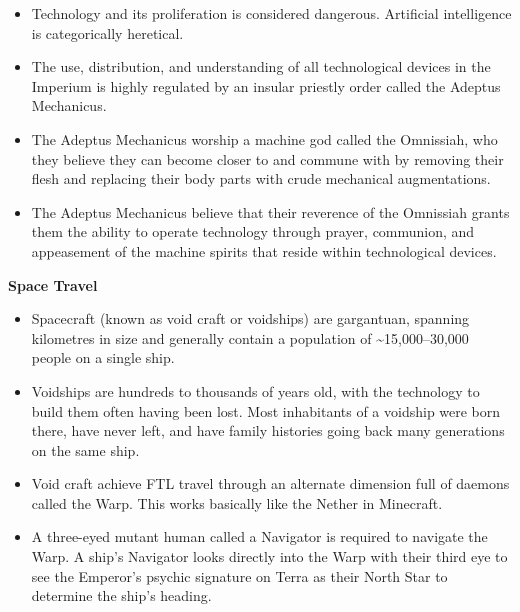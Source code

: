 \documentclass[10pt,a4paper]{article}
\newcommand{\rpgsection}[1]{%
  \vspace{0.8em}%
  {\headerfont\bfseries\Large #1}\par%
  \vspace{0.5em}%
}
\begin{document}
\begin{multicols}{2}
\begin{itemize}
  \item Technology and its proliferation is considered dangerous. Artificial intelligence is categorically heretical.
  \item The use, distribution, and understanding of all technological devices in the Imperium is highly regulated by an insular priestly order called the Adeptus Mechanicus.
  \item The Adeptus Mechanicus worship a machine god called the Omnissiah, who they believe they can become closer to and commune with by removing their flesh and replacing their body parts with crude mechanical augmentations.
  \item The Adeptus Mechanicus believe that their reverence of the Omnissiah grants them the ability to operate technology through prayer, communion, and appeasement of the machine spirits that reside within technological devices.
\end{itemize}

\rpgsection{Space Travel}
\begin{itemize}
  \item Spacecraft (known as void craft or voidships) are gargantuan, spanning kilometres in size and generally contain a population of \textasciitilde15,000–30,000 people on a single ship.
  \item Voidships are hundreds to thousands of years old, with the technology to build them often having been lost. Most inhabitants of a voidship were born there, have never left, and have family histories going back many generations on the same ship.
  \item Void craft achieve FTL travel through an alternate dimension full of daemons called the Warp. This works basically like the Nether in Minecraft.
  \item A three-eyed mutant human called a Navigator is required to navigate the Warp. A ship’s Navigator looks directly into the Warp with their third eye to see the Emperor’s psychic signature on Terra as their North Star to determine the ship’s heading.
\end{itemize}


\end{multicols}
\end{document}
